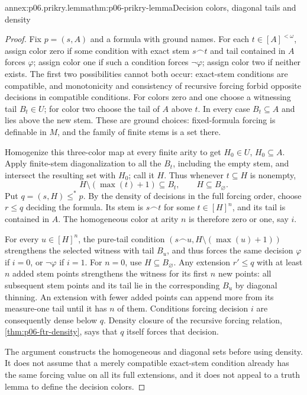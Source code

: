 \begin{annexitem}{annex:p06.prikry.lemma}{thm:p06-prikry-lemma}{Decision colors, diagonal tails and density}
\begin{proof}
Fix \(p=(s,A)\) and a formula with ground names. For each
\(t\in[A]^{<\omega}\), assign color zero if some condition with exact
stem \(s\mathbin{\frown}t\) and tail contained in \(A\) forces
\(\varphi\); assign color one if such a condition forces
\(\neg\varphi\); assign color two if neither exists. The first two
possibilities cannot both occur: exact-stem conditions are compatible,
and monotonicity and consistency of recursive forcing forbid opposite
decisions in compatible conditions. For colors zero and one choose a
witnessing tail \(B_t\in U\); for color two choose the tail of \(A\)
above \(t\). In every case \(B_t\subseteq A\) and lies above the new
stem. These are ground choices: fixed-formula forcing is definable in
\(M\), and the family of finite stems is a set there.

Homogenize this three-color map at every finite arity to get
\(H_0\in U\), \(H_0\subseteq A\). Apply finite-stem diagonalization
to all the \(B_t\), including the empty stem, and intersect the resulting
set with \(H_0\); call it \(H\). Thus whenever \(t\subseteq H\)
is nonempty,
\[
 H\setminus(\max(t)+1)\subseteq B_t,
 \qquad H\subseteq B_{\varnothing}.
\]
Put \(q=(s,H)\leq^*p\). By the density of decisions in the full
forcing order, choose \(r\leq q\) deciding the formula. Its stem is
\(s\mathbin{\frown}t\) for some \(t\in[H]^n\), and its tail is
contained in \(A\). The homogeneous color at arity \(n\) is therefore
zero or one, say \(i\).

For every \(u\in[H]^n\), the pure-tail condition
\((s\mathbin{\frown}u,H\setminus(\max(u)+1))\) strengthens the
selected witness with tail \(B_u\), and thus forces the same decision
\(\varphi\) if \(i=0\), or \(\neg\varphi\) if \(i=1\).
For \(n=0\), use \(H\subseteq B_{\varnothing}\).
Any extension \(r'\leq q\) with at least \(n\) added stem points
strengthens the witness for its first \(n\) new points: all subsequent
stem points and its tail lie in the corresponding \(B_u\) by diagonal
thinning. An extension with fewer added points can append more from its
measure-one tail until it has \(n\) of them. Conditions forcing decision
\(i\) are consequently dense below \(q\). Density closure of the
recursive forcing relation, \cref{thm:p06-ftr-density}, says that
\(q\) itself forces that decision.

The argument constructs the homogeneous and diagonal sets before using
density. It does not assume that a merely compatible exact-stem condition
already has the same forcing value on all its full extensions, and it
does not appeal to a truth lemma to define the decision colors.
\end{proof}
\end{annexitem}

